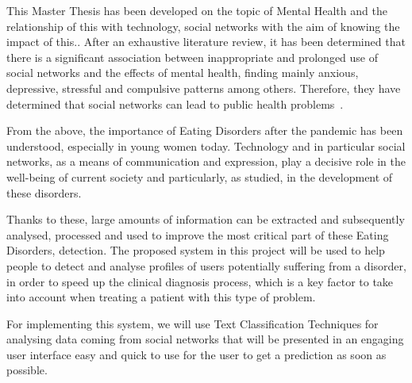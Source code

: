 



This Master Thesis has been developed on the topic of Mental Health and the relationship of this with technology, social networks with the aim of knowing the impact of this.. After an exhaustive literature review, it has been determined that there is a significant association between inappropriate and prolonged use of social networks and the effects of mental health, finding mainly anxious, depressive, stressful and compulsive patterns among others. Therefore, they have determined that social networks can lead to public health problems~\cite{pozo2022impacto}.

From the above, the importance of Eating Disorders after the pandemic has been understood, especially in young women today. Technology and in particular social networks, as a means of communication and expression, play a decisive role in the well-being of current society and particularly, as studied, in the development of these disorders.

Thanks to these, large amounts of information can be extracted and subsequently analysed, processed and used to improve the most critical part of these Eating Disorders, detection. The proposed system in this project will be used to help people to detect and analyse profiles of users potentially suffering from a disorder, in order to speed up the clinical diagnosis process, which is a key factor to take into account when treating a patient with this type of problem.

For implementing this system, we will use Text Classification Techniques for analysing data coming from social networks that will be presented in an engaging user interface easy and quick to use for the user to get a prediction as soon as possible.


